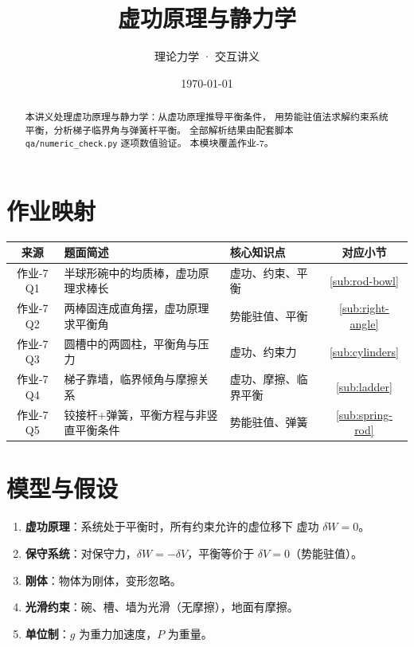 \documentclass[UTF8,a4paper,11pt]{ctexart}
\title{\textbf{虚功原理与静力学}}
\author{理论力学 · 交互讲义}
\date{\today}
\begin{document}
\maketitle

\begin{abstract}
本讲义处理虚功原理与静力学：从虚功原理推导平衡条件，
用势能驻值法求解约束系统平衡，分析梯子临界角与弹簧杆平衡。
全部解析结果由配套脚本 \texttt{qa/numeric\_check.py} 逐项数值验证。
本模块覆盖作业-7。
\end{abstract}

\tableofcontents
\newpage

\section{作业映射}
\label{sec:map}

\begin{center}
\small
\begin{tabular}{cp{6.5cm}p{3.5cm}c}
\toprule
来源 & 题面简述 & 核心知识点 & 对应小节 \\
\midrule
作业-7 Q1 & 半球形碗中的均质棒，虚功原理求棒长 &
  虚功、约束、平衡 & \ref{sub:rod-bowl} \\
作业-7 Q2 & 两棒固连成直角摆，虚功原理求平衡角 &
  势能驻值、平衡 & \ref{sub:right-angle} \\
作业-7 Q3 & 圆槽中的两圆柱，平衡角与压力 &
  虚功、约束力 & \ref{sub:cylinders} \\
作业-7 Q4 & 梯子靠墙，临界倾角与摩擦关系 &
  虚功、摩擦、临界平衡 & \ref{sub:ladder} \\
作业-7 Q5 & 铰接杆+弹簧，平衡方程与非竖直平衡条件 &
  势能驻值、弹簧 & \ref{sub:spring-rod} \\
\bottomrule
\end{tabular}
\end{center}

\section{模型与假设}
\label{sec:model}

\begin{enumerate}
  \item \textbf{虚功原理}：系统处于平衡时，所有约束允许的虚位移下
        虚功 $\delta W=0$。
  \item \textbf{保守系统}：对保守力，$\delta W=-\delta V$，平衡等价于
        $\delta V=0$（势能驻值）。
  \item \textbf{刚体}：物体为刚体，变形忽略。
  \item \textbf{光滑约束}：碗、槽、墙为光滑（无摩擦），地面有摩擦。
  \item \textbf{单位制}：$g$ 为重力加速度，$P$ 为重量。
\end{enumerate}
\end{document}

